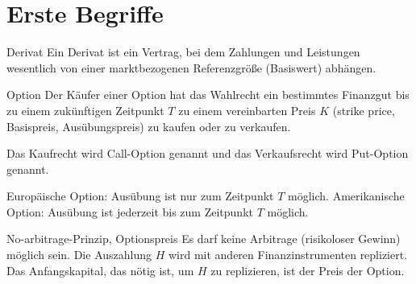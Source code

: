 \section{Erste Begriffe}

\begin{karte}{Derivat}
Ein Derivat ist ein Vertrag, bei dem Zahlungen und Leistungen wesentlich von einer marktbezogenen Referenzgröße 
(Basiswert) abhängen.
\end{karte}

\begin{karte}{Option}
Der Käufer einer Option hat das Wahlrecht ein bestimmtes Finanzgut bis zu einem zukünftigen Zeitpunkt \(T\) 
zu einem vereinbarten Preis \(K\) (strike price, Basispreis, Ausübungspreis) zu kaufen oder zu verkaufen.

Das Kaufrecht wird Call-Option genannt und das Verkaufsrecht wird Put-Option genannt.

Europäische Option: Ausübung ist nur zum Zeitpunkt \(T\) möglich. 
Amerikanische Option: Ausübung ist jederzeit bis zum Zeitpunkt \(T\) möglich.
\end{karte}

\begin{karte}{No-arbitrage-Prinzip, Optionspreis}
Es darf keine Arbitrage (risikoloser Gewinn) möglich sein. Die Auszahlung \(H\) wird mit anderen 
Finanzinstrumenten repliziert. Das Anfangskapital, das nötig ist, um \(H\) zu replizieren, ist der Preis der Option.
\end{karte}